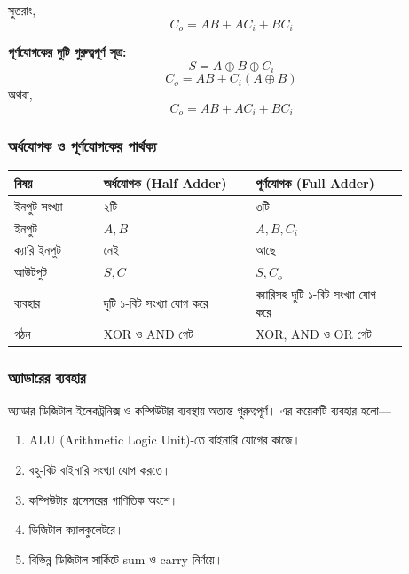 সুতরাং,
\[
\boxed{C_o=AB+AC_i+BC_i}
\]

\par\begingroup

\textbf{পূর্ণযোগকের দুটি গুরুত্বপূর্ণ সূত্র:}
\[
S=A\oplus B\oplus C_i
\]
\[
C_o=AB+C_i(A\oplus B)
\]
অথবা,
\[
C_o=AB+AC_i+BC_i
\]
\par\endgroup



\subsubsection*{অর্ধযোগক ও পূর্ণযোগকের পার্থক্য}

\begin{center}
\renewcommand{\arraystretch}{1.35}
\begin{tabular}{|p{0.20\linewidth}|p{0.34\linewidth}|p{0.34\linewidth}|}
\hline
\rowcolor{gray!15}
\textbf{বিষয়} & \textbf{অর্ধযোগক (\textenglish{Half Adder})} & \textbf{পূর্ণযোগক (\textenglish{Full Adder})} \\
\hline
ইনপুট সংখ্যা & ২টি & ৩টি \\
\hline
ইনপুট & \(A,B\) & \(A,B,C_i\) \\
\hline
ক্যারি ইনপুট & নেই & আছে \\
\hline
আউটপুট & \(S,C\) & \(S,C_o\) \\
\hline
ব্যবহার & দুটি ১-বিট সংখ্যা যোগ করে & ক্যারিসহ দুটি ১-বিট সংখ্যা যোগ করে \\
\hline
গঠন & \textenglish{XOR} ও \textenglish{AND} গেট & \textenglish{XOR}, \textenglish{AND} ও \textenglish{OR} গেট \\
\hline
\end{tabular}
\end{center}


\subsubsection*{অ্যাডারের ব্যবহার}

অ্যাডার ডিজিটাল ইলেকট্রনিক্স ও কম্পিউটার ব্যবস্থায় অত্যন্ত গুরুত্বপূর্ণ।
এর কয়েকটি ব্যবহার হলো—

\begin{enumerate}
    \item \textenglish{ALU} (\textenglish{Arithmetic Logic Unit})-তে বাইনারি যোগের কাজে।
    \item বহু-বিট বাইনারি সংখ্যা যোগ করতে।
    \item কম্পিউটার প্রসেসরের গাণিতিক অংশে।
    \item ডিজিটাল ক্যালকুলেটরে।
    \item বিভিন্ন ডিজিটাল সার্কিটে \textenglish{sum} ও \textenglish{carry} নির্ণয়ে।
\end{enumerate}

